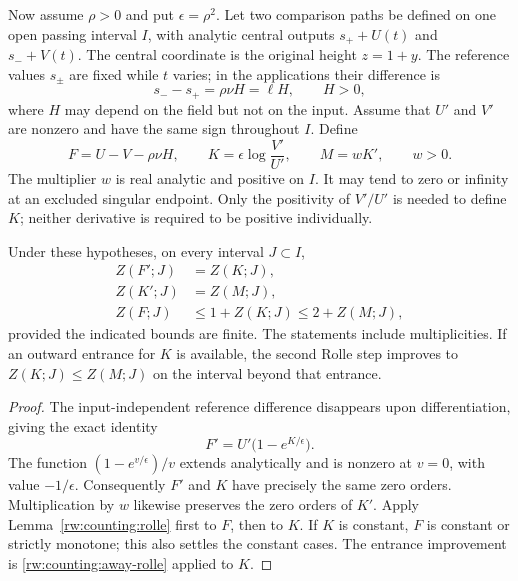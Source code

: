 Now assume $\rho>0$ and put $\epsilon=\rho^2$.  Let two comparison
paths be defined on one open passing interval $I$, with analytic central outputs
$s_++U(t)$ and $s_-+V(t)$.  The central coordinate is the original
height $z=1+y$.  The reference values $s_\pm$ are fixed while $t$ varies;
in the applications their difference is
\[
 s_--s_+=\rho\nu H=\ell H,\qquad H>0,
\]
where $H$ may depend on the field but not on the input.  Assume that
$U'$ and $V'$ are nonzero and have the same sign throughout $I$.
Define
\begin{equation}\label{rw:counting:levels}
 F=U-V-\rho\nu H,\qquad
 K=\epsilon\log\frac{V'}{U'},\qquad
 M=wK',\qquad w>0.
\end{equation}
The multiplier $w$ is real analytic and positive on $I$.
It may tend to zero or infinity at an excluded singular
endpoint.  Only the positivity of $V'/U'$ is needed to define $K$;
neither derivative is required to be positive individually.

\begin{lemma}
\label{rw:zero-calculus}
Under these hypotheses, on every interval $J\subset I$,
\begin{equation}\label{rw:counting:levels-count}
 \begin{split}
 Z(F';J)&=Z(K;J),\\
 Z(K';J)&=Z(M;J),\\
 Z(F;J)&\le 1+Z(K;J)\le 2+Z(M;J),
 \end{split}
\end{equation}
provided the indicated bounds are finite.  The statements include
multiplicities.  If an outward entrance for $K$ is available, the second
Rolle step improves to $Z(K;J)\le Z(M;J)$ on the interval beyond that
entrance.
\end{lemma}
\begin{proof}
The input-independent reference difference disappears upon
differentiation, giving the exact identity
\[
 F'=U'\bigl(1-e^{K/\epsilon}\bigr).
\]
The function $(1-e^{v/\epsilon})/v$ extends analytically and is
nonzero at $v=0$, with value $-1/\epsilon$.  Consequently $F'$ and
$K$ have precisely the same zero orders.  Multiplication by $w$ likewise
preserves the zero orders of $K'$.  Apply
Lemma~\ref{rw:counting:rolle} first to $F$, then to $K$.
If $K$ is constant, $F$ is constant or strictly monotone; this also
settles the constant cases.  The entrance improvement is
\eqref{rw:counting:away-rolle} applied to $K$.
\end{proof}

